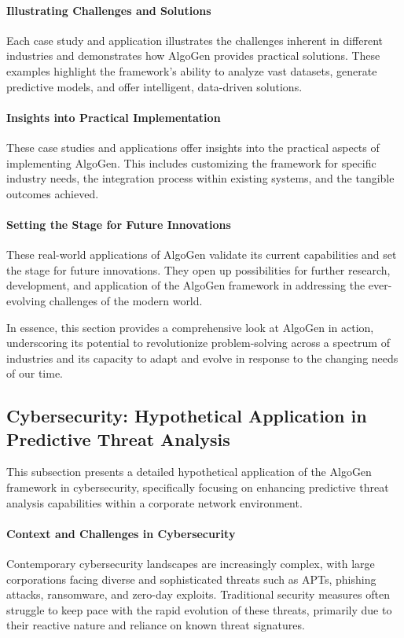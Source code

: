 \documentclass{article}
\begin{document}
\paragraph{Illustrating Challenges and Solutions}
Each case study and application illustrates the challenges inherent in different industries and demonstrates how AlgoGen provides practical solutions. These examples highlight the framework's ability to analyze vast datasets, generate predictive models, and offer intelligent, data-driven solutions.

\paragraph{Insights into Practical Implementation}
These case studies and applications offer insights into the practical aspects of implementing AlgoGen. This includes customizing the framework for specific industry needs, the integration process within existing systems, and the tangible outcomes achieved.

\paragraph{Setting the Stage for Future Innovations}
These real-world applications of AlgoGen validate its current capabilities and set the stage for future innovations. They open up possibilities for further research, development, and application of the AlgoGen framework in addressing the ever-evolving challenges of the modern world.

In essence, this section provides a comprehensive look at AlgoGen in action, underscoring its potential to revolutionize problem-solving across a spectrum of industries and its capacity to adapt and evolve in response to the changing needs of our time.


\subsection{Cybersecurity: Hypothetical Application in Predictive Threat Analysis}
This subsection presents a detailed hypothetical application of the AlgoGen framework in cybersecurity, specifically focusing on enhancing predictive threat analysis capabilities within a corporate network environment.

\paragraph{Context and Challenges in Cybersecurity}
Contemporary cybersecurity landscapes are increasingly complex, with large corporations facing diverse and sophisticated threats such as APTs, phishing attacks, ransomware, and zero-day exploits. Traditional security measures often struggle to keep pace with the rapid evolution of these threats, primarily due to their reactive nature and reliance on known threat signatures.
\end{document}

